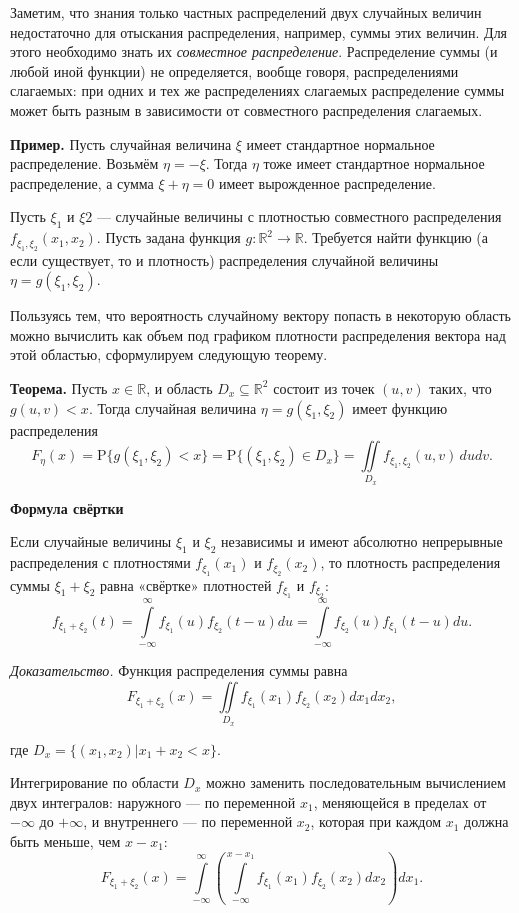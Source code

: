 \documentclass[11pt,a4paper]{article}
\begin{document}
Заметим, что знания только частных распределений двух случайных величин
недостаточно для отыскания распределения, например, суммы этих величин.
Для этого необходимо знать их \emph{совместное распределение}.
Распределение суммы (и любой иной функции) не определяется, вообще
говоря, распределениями слагаемых: при одних и тех же распределениях
слагаемых распределение суммы может быть разным в зависимости от
совместного распределения слагаемых.

\textbf{Пример.} Пусть случайная величина \(\xi\) имеет стандартное
нормальное распределение. Возьмём \(\eta = -\xi\). Тогда \(\eta\) тоже
имеет стандартное нормальное распределение, а сумма \(\xi + \eta = 0\)
имеет вырожденное распределение.

    Пусть \(\xi_1\) и \(\xi2\) --- случайные величины с плотностью
совместного распределения \(f_{\xi_1,\xi_2}(x_1, x_2)\). Пусть задана
функция \(g: \mathbb{R}^2 \rightarrow \mathbb{R}\). Требуется найти
функцию (а если существует, то и плотность) распределения случайной
величины \(\eta = g (\xi_1,\xi_2)\).

Пользуясь тем, что вероятность случайному вектору попасть в некоторую
область можно вычислить как объем под графиком плотности распределения
вектора над этой областью, сформулируем следующую теорему.

\textbf{Теорема.} Пусть \(x \in \mathbb{R}\), и область
\(D_x \subseteq \mathbb{R}^2\) состоит из точек \((u, v)\) таких, что
\(g(u, v) < x\). Тогда случайная величина \(\eta = g(\xi_1,\xi_2)\)
имеет функцию распределения \[
F_\eta(x) = \mathrm{P}\{g(\xi_1,\xi_2) < x\} = \mathrm{P}\{(\xi_1,\xi_2) \in D_x\} = \iint\limits_{D_x} f_{\xi_1,\xi_2}(u,v)\,dudv.
\]

\textbf{Формула свёртки}

Если случайные величины \(\xi_1\) и \(\xi_2\) независимы и имеют
абсолютно непрерывные распределения с плотностями \(f_{\xi_1}(x_1)\) и
\(f_{\xi_2}(x_2)\), то плотность распределения суммы \(\xi_1 + \xi_2\)
равна «свёртке» плотностей \(f_{\xi_1}\) и \(f_{\xi_2}\): \[
  f_{\xi_1 +\xi_2}(t) = \int\limits_{-\infty}^{\infty} f_{\xi_1}(u) f_{\xi_2}(t-u) du
  = \int\limits_{-\infty}^{\infty} f_{\xi_2}(u) f_{\xi_1}(t-u) du.
\]

    \emph{Доказательство.} Функция распределения суммы равна \[
  F_{\xi_1 +\xi_2}(x) = \iint\limits_{D_x} f_{\xi_1}(x_1) f_{\xi_2}(x_2) dx_1 dx_2,
\]

где \(D_x = \{(x_1,x_2) | x_1+x_2<x\}\).

Интегрирование по области \(D_x\) можно заменить последовательным
вычислением двух интегралов: наружного --- по переменной \(x_1\),
меняющейся в пределах от \(-\infty\) до \(+\infty\), и внутреннего ---
по переменной \(x_2\), которая при каждом \(x_1\) должна быть меньше,
чем \(x - x_1\): \[
  F_{\xi_1 +\xi_2}(x) = \int\limits_{-\infty}^{\infty} \left( \int\limits_{-\infty}^{x-x_1} f_{\xi_1}(x_1) f_{\xi_2}(x_2) dx_2 \right) dx_1.
\]
\end{document}

